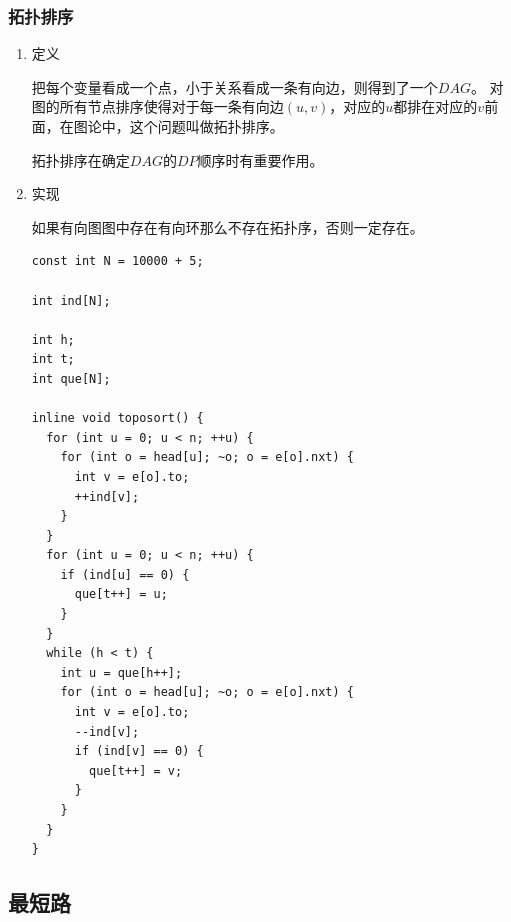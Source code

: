 \documentclass[11pt]{article}
\begin{document}
\subsubsection{拓扑排序}
\label{sec:org384495a}

\begin{enumerate}
\item 定义
\label{sec:orgd9e4803}

把每个变量看成一个点，小于关系看成一条有向边，则得到了一个\(DAG\)。 对图的所有节点排序使得对于每一条有向边\((u,v)\)，对应的\(u\)都排在对应的\(v\)前面，在图论中，这个问题叫做拓扑排序。

拓扑排序在确定\(DAG\)的\(DP\)顺序时有重要作用。

\item 实现
\label{sec:org38372f2}

如果有向图图中存在有向环那么不存在拓扑序，否则一定存在。

\begin{verbatim}
const int N = 10000 + 5;

int ind[N];

int h;
int t;
int que[N];

inline void toposort() {
  for (int u = 0; u < n; ++u) {
    for (int o = head[u]; ~o; o = e[o].nxt) {
      int v = e[o].to;
      ++ind[v];
    }
  }
  for (int u = 0; u < n; ++u) {
    if (ind[u] == 0) {
      que[t++] = u;
    }
  }
  while (h < t) {
    int u = que[h++];
    for (int o = head[u]; ~o; o = e[o].nxt) {
      int v = e[o].to;
      --ind[v];
      if (ind[v] == 0) {
        que[t++] = v;
      }
    }
  }
}
\end{verbatim}
\end{enumerate}
\subsection{最短路}
\label{sec:org80f89a7}
\end{document}
